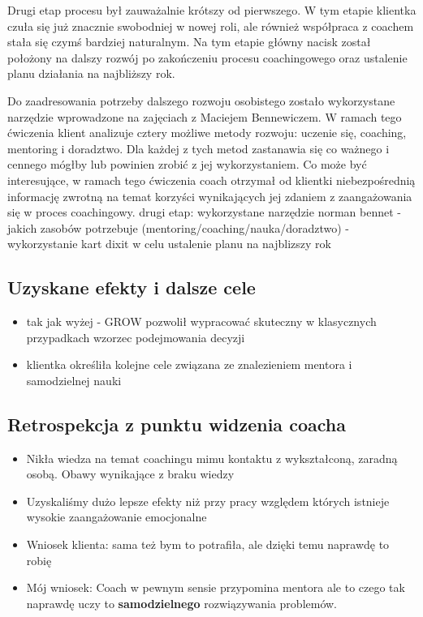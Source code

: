Drugi etap procesu był zauważalnie krótszy od pierwszego. W tym etapie klientka czuła się już znacznie swobodniej w nowej roli, ale również współpraca
z coachem stała się czymś bardziej naturalnym. Na tym etapie główny nacisk został położony na dalszy rozwój po zakończeniu procesu coachingowego
oraz ustalenie planu działania na najbliższy rok.

Do zaadresowania potrzeby dalszego rozwoju osobistego zostało wykorzystane narzędzie wprowadzone na zajęciach z Maciejem Bennewiczem. W ramach tego
ćwiczenia klient analizuje cztery możliwe metody rozwoju: uczenie się, coaching, mentoring i doradztwo. Dla każdej z tych metod zastanawia się
co ważnego i cennego mógłby lub powinien zrobić z jej wykorzystaniem. Co może być interesujące, w ramach tego ćwiczenia coach otrzymał od klientki
niebezpośrednią informację zwrotną na temat korzyści wynikających jej zdaniem z zaangażowania się w proces coachingowy.
drugi etap:
  wykorzystane narzędzie norman bennet - jakich zasobów potrzebuje (mentoring/coaching/nauka/doradztwo)
- wykorzystanie kart dixit w celu ustalenie planu na najblizszy rok

\subsection{Uzyskane efekty i dalsze cele}

\begin{itemize}
  \item tak jak wyżej - GROW pozwolił wypracować skuteczny w klasycznych przypadkach wzorzec podejmowania decyzji
  \item klientka określiła kolejne cele związana ze znalezieniem mentora i samodzielnej nauki
\end{itemize}

\subsection{Retrospekcja z punktu widzenia coacha}

\begin{itemize}
  \item Nikła wiedza na temat coachingu mimu kontaktu z wykształconą, zaradną osobą. Obawy wynikające z braku wiedzy
  \item Uzyskaliśmy dużo lepsze efekty niż przy pracy względem których istnieje wysokie zaangażowanie emocjonalne
  \item Wniosek klienta: sama też bym to potrafiła, ale dzięki temu naprawdę to robię
  \item Mój wniosek: Coach w pewnym sensie przypomina mentora ale to czego tak naprawdę uczy to \textbf{samodzielnego} rozwiązywania problemów.
\end{itemize}
